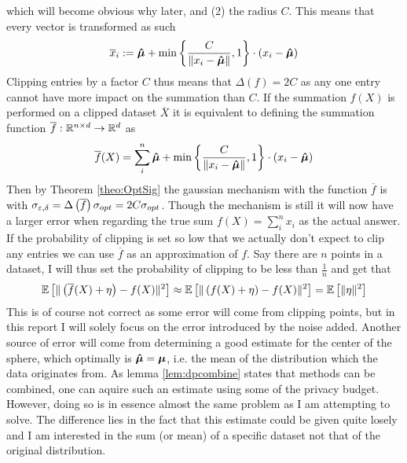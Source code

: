 \documentclass[a4paper,12pt]{article}
\begin{document}
which will become obvious why later, and (2) the radius $C$.
This means that every vector is transformed as such
\[
    \overline{x}_i := \bm{\hat{\mu}} + \min \left \{\frac{C}{\| x_i - \bm{\hat{\mu}} \|}, 1\right\} \cdot (x_i - \bm{\hat{\mu}})
\]
Clipping entries by a factor $C$ thus means that $ \Delta(f) = 2C $ 
as any one entry cannot have more impact on the summation than $C$.
If the summation $f(X)$ is 
performed on a clipped dataset $\overline{X}$ it is equivalent to
defining the summation function $\overline{f}: \mathbb{R}^{n \times d} \rightarrow \mathbb{R}^d$ as
\[
    \overline{f}(X) = \sum_i^n \bm{\hat{\mu}} + \min \left \{ \frac{C}{\| x_i - \bm{\hat{\mu}} \|}, 1\right\} \cdot (x_i - \bm{\hat{\mu}})
\]
Then by Theorem \ref{theo:OptSig} the 
gaussian mechanism with the function $\overline{f}$ is \edp with
$\sigma_{\varepsilon, \delta} = \Delta\left (\overline{f}\right) \sigma_{opt} = 2C \sigma_{opt}$.
Though the mechanism is still \edp it will now have 
a larger error when regarding the true sum
$f(X) = \sum_i^n x_i$ as the actual answer. If the probability of clipping is set
so low that we actually don't expect to clip any entries we can use $\overline{f}$ as an approximation of $f$.
Say there are $n$ points in a dataset, I will thus set the probability of clipping to be less than $\frac{1}{n}$ and get that
\[
    \mathbb{E} \left [ \| \left (\overline{f}(X) + \eta\right) - f(X) \|^2 \right] \approx \mathbb{E} \left [ \| \left (f(X) + \eta\right) - f(X) \|^2 \right] = \mathbb{E} \left [ \| \eta \|^2 \right]
\]
This is of course not correct as some error will come from clipping points, but in this report 
I will solely focus on the error introduced by the noise added. Another source of error will come from
determining a good estimate for the center of the sphere, which optimally is $\bm{\hat{\mu}} = \bm{\mu}$, i.e. 
the mean of the distribution which the data originates from.
As lemma \ref{lem:dpcombine} states that \edp methods can be combined,
one can aquire such an estimate using some of the privacy budget.
However, doing so is in essence almost the same problem as I am attempting to solve.
The difference lies in the fact that this estimate could be given quite 
losely and I am interested in the sum (or mean) of a specific dataset not that of the original distribution. \\
\end{document}
